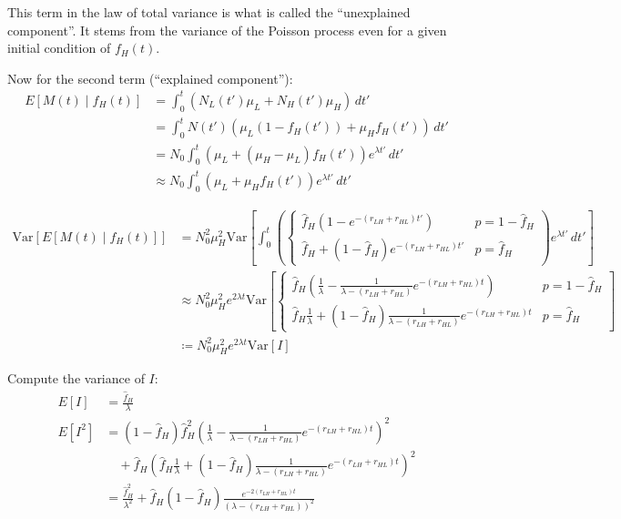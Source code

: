 This term in the law of total variance is what is called the “unexplained component”.
It stems from the variance of the Poisson process even for a given initial condition of $f_{H}(t)$.

Now for the second term (“explained component”):
\begin{align*}
E[M(t) \mid f_{H}(t)] &= \int_{0}^{t} \left(N_{L}(t') \mu_{L} + N_{H}(t') \mu_{H}\right) \, dt' \\
&= \int_{0}^{t} N(t') \left(\mu_{L} (1 - f_{H}(t')) + \mu_{H} f_{H}(t')\right) \, dt' \\
&= N_{0} \int_{0}^{t} \left(\mu_{L} + (\mu_{H} - \mu_{L}) f_{H}(t')\right) e^{\lambda t'} \, dt' \\
&\approx N_{0} \int_{0}^{t} \left(\mu_{L} + \mu_{H} f_{H}(t')\right) e^{\lambda t'} \, dt'
\end{align*}

\begin{align*}
\text{Var}\left[E[M(t) \mid f_{H}(t)]\right] &= N_{0}^{2} \mu_{H}^{2} \text{Var}\left[\int_{0}^{t} \left(\begin{cases}
\hat{f}_{H} \left(1 - e^{-(r_{LH} + r_{HL})t'}\right) & p = 1 - \hat{f}_{H} \\
\hat{f}_{H} + \left(1 - \hat{f}_{H}\right) e^{-(r_{LH} + r_{HL})t'} & p = \hat{f}_{H}
\end{cases}\right) e^{\lambda t'} \, dt' \right] \\
&\approx N_{0}^{2} \mu_{H}^{2} e^{2 \lambda t} \text{Var}\left[\begin{cases}
\hat{f}_{H} \left(\frac{1}{\lambda} - \frac{1}{\lambda - (r_{LH} + r_{HL})} e^{-(r_{LH} + r_{HL}) t}\right) & p = 1 - \hat{f}_{H} \\
\hat{f}_{H} \frac{1}{\lambda} + \left(1 - \hat{f}_{H}\right) \frac{1}{\lambda - (r_{LH} + r_{HL})} e^{-(r_{LH} + r_{HL}) t} & p = \hat{f}_{H}
\end{cases}\right] \\
&\coloneqq N_{0}^{2} \mu_{H}^{2} e^{2 \lambda t} \text{Var}\left[I\right]
\end{align*}

Compute the variance of $I$:
\begin{align*}
E[I] &= \frac{\hat{f}_{H}}{\lambda} \\
E[I^{2}] &= \left(1 - \hat{f}_{H}\right) \hat{f}_{H}^{2} \left(\frac{1}{\lambda} - \frac{1}{\lambda - (r_{LH} + r_{HL})} e^{-(r_{LH} + r_{HL}) t}\right)^{2} \\
&\quad + \hat{f}_{H} \left(\hat{f}_{H} \frac{1}{\lambda} + \left(1 - \hat{f}_{H}\right) \frac{1}{\lambda - (r_{LH} + r_{HL})} e^{-(r_{LH} + r_{HL}) t}\right)^{2} \\
&= \frac{\hat{f}_{H}^{2}}{\lambda^{2}} + \hat{f}_{H} \left(1 - \hat{f}_{H}\right) \frac{e^{-2(r_{LH} + r_{HL})t}}{\left(\lambda - (r_{LH} + r_{HL})\right)^{2}}
\end{align*}

